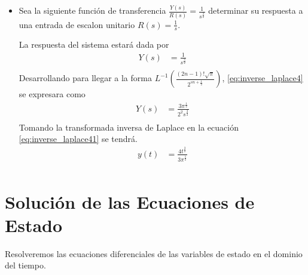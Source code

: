 \documentclass[12pt]{article}
\begin{document}
\begin{itemize}
\item Sea la siguiente función de transferencia $\frac{Y(s)}{R(s)}=\frac{1}{s^{\frac{3}{2}}}$ determinar su respuesta a una entrada de escalon unitario $R(s)=\frac{1}{s}$.
    
    La respuesta del sistema estará dada por 
    \begin{equation}
        \begin{split}
            Y(s)&=\frac{1}{s^{\frac{3}{2}}}\\
            \label{eq:inverse_laplace4}
        \end{split}
    \end{equation}
    Desarrollando para llegar a la forma $L^{-1}(\frac{(2n-1)!\sqrt{\pi}}{2^{sn+\frac{1}{2}}})$, \ref{eq:inverse_laplace4} se expresara como
    \begin{equation}
        \begin{split}
            Y(s)&=\frac{3\pi^{\frac{1}{2}}}{2^2s^{\frac{3}{2}}}\\
            \label{eq:inverse_laplace41}
        \end{split}
    \end{equation}
    Tomando la transformada inversa de Laplace en la ecuación \ref{eq:inverse_laplace41} se tendrá.
    \begin{equation}
        \begin{split}
            y(t)&=\frac{4t^{\frac{3}{2}}}{3\pi^{\frac{1}{2}}}\\
            \label{eq:inverse_laplace42}
        \end{split}
    \end{equation}
\end{itemize}
\section{Solución de las Ecuaciones de Estado}
Resolveremos las ecuaciones diferenciales de las variables de estado en el dominio del tiempo.
\end{document}
